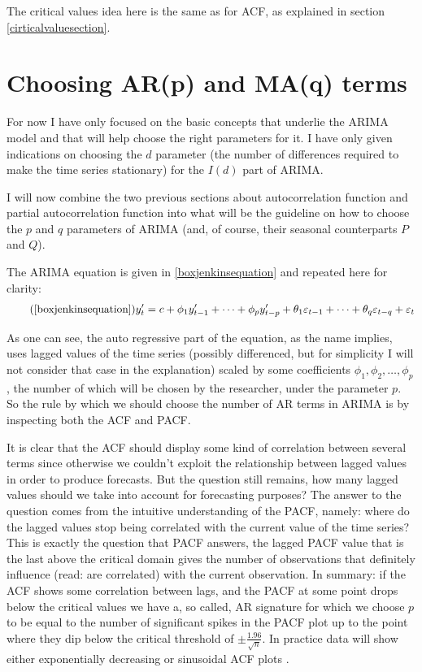 \documentclass[12pt,a4paper,titlepage]{report}
\begin{document}
The critical values idea here is the same as for ACF, as explained in section \ref{cirticalvaluesection}.

\section{Choosing AR(p) and MA(q) terms} \label{choosingarandmasection}

For now I have only focused on the basic concepts that underlie the ARIMA model and that will help choose the right parameters for it.  I have only given indications on choosing the $ d $ parameter (the number of differences required to make the time series stationary) for the $ I(d) $ part of ARIMA.

I will now combine the two previous sections about autocorrelation function and partial autocorrelation function into what will be the guideline on how to choose the $ p $ and $ q $ parameters of ARIMA (and, of course, their seasonal counterparts $ P $ and $ Q $).

The ARIMA equation is given in \ref{boxjenkinsequation} and repeated here for clarity:
\begin{equation}
\tag{\ref{boxjenkinsequation}}
y'_{t} = c + \phi_{1}y'_{t-1} + \cdots + \phi_{p}y'_{t-p} + \theta_{1}\varepsilon_{t-1} + \cdots + \theta_{q}\varepsilon_{t-q} + \varepsilon_{t}
\end{equation}

As one can see, the auto regressive part of the equation, as the name implies, uses lagged values of the time series (possibly differenced, but for simplicity I will not consider that case in the explanation) scaled by some coefficients $ \phi_{1}, \phi_{2}, \dots, \phi_{p} $, the number of which will be chosen by the researcher, under the parameter $ p $. So the rule by which we should choose the number of AR terms in ARIMA is by inspecting both the ACF and PACF. 

It is clear that the ACF should display some kind of correlation between several terms since otherwise we couldn't exploit the relationship between lagged values in order to produce forecasts. But the question still remains, how many lagged values should we take into account for forecasting purposes? The answer to the question comes from the intuitive understanding of the PACF, namely: where do the lagged values stop being correlated with the current value of the time series? This is exactly the question that PACF answers, the lagged PACF value that is the last above the critical domain gives the number of observations that definitely influence (read: are correlated) with the current observation. In summary: if the ACF shows some correlation between lags, and the PACF at some point drops below the critical values we have a, so called, AR signature for which we choose $ p $ to be equal to the number of significant spikes in the PACF plot up to the point where they dip below the critical threshold of $ \pm \frac{1.96}{\sqrt{n}} $. In practice data will show either exponentially decreasing or sinusoidal ACF plots \cite{fpp2nonseasonalarima}.
\end{document}
